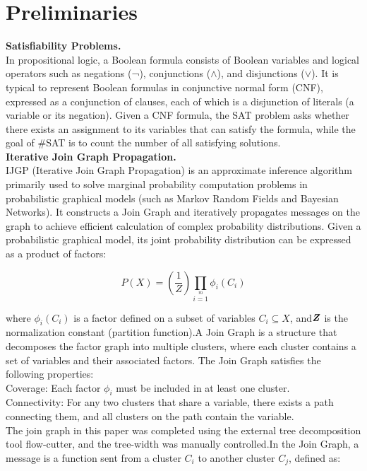 \section{Preliminaries}

\textbf{Satisfiability Problems.\\} 
In propositional logic, a Boolean formula consists of Boolean variables and logical operators such as negations (¬), 
conjunctions ($ \land $), and disjunctions ($\lor$). It is typical to represent Boolean formulas in conjunctive normal 
form (CNF), expressed as a conjunction of clauses, each of which is a disjunction of literals (a variable or its negation). 
Given a CNF formula, the SAT problem asks whether there exists an assignment to its variables that can satisfy the formula, 
while the goal of \#SAT is to count the number of all satisfying solutions.\\

\textbf{Iterative Join Graph Propagation.\\}
IJGP (Iterative Join Graph Propagation) is an approximate inference algorithm primarily used to solve marginal 
probability computation problems in probabilistic graphical models (such as Markov Random Fields and Bayesian Networks). 
It constructs a Join Graph and iteratively propagates messages on the graph to achieve efficient calculation of complex 
probability distributions.
Given a probabilistic graphical model, its joint probability distribution can be expressed as a product of factors:

\begin{equation}
P(X)=\left(\frac{1}{Z}\right)\prod\limits_{i=1}\limits^m\phi_i(C_i)
\end{equation}

where \(\phi_i(C_i)\) is a factor defined on a subset of variables \(C_i\subseteq X\), and\(\textbf{\textit{Z}}\) is 
the normalization constant (partition function).A Join Graph is a structure that decomposes the factor graph into multiple 
clusters, where each cluster contains a set of variables and their associated factors. The Join Graph satisfies the following 
properties:\\
Coverage: Each factor \(\phi_i\) must be included in at least one cluster.\\
Connectivity: For any two clusters that share a variable, there exists a path connecting them, and all clusters on the 
path contain the variable.\\
The join graph in this paper was completed using the external tree decomposition tool flow-cutter, and the tree-width was 
manually controlled.In the Join Graph, a message is a function sent from a cluster \(C_i\) to another cluster \(C_j\), 
defined as:

